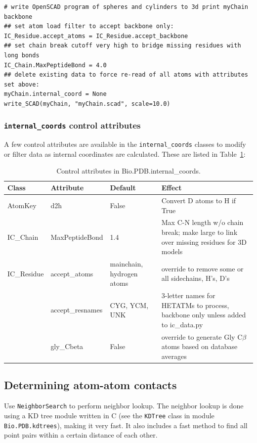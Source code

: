\begin{verbatim}
# write OpenSCAD program of spheres and cylinders to 3d print myChain backbone
## set atom load filter to accept backbone only:
IC_Residue.accept_atoms = IC_Residue.accept_backbone
## set chain break cutoff very high to bridge missing residues with long bonds
IC_Chain.MaxPeptideBond = 4.0
## delete existing data to force re-read of all atoms with attributes set above:
myChain.internal_coord = None
write_SCAD(myChain, "myChain.scad", scale=10.0)
\end{verbatim}

\subsubsection{\texttt{internal\_coords} control attributes}

A few control attributes are available in the \texttt{internal\_coords} classes to modify or
filter data as internal coordinates are calculated.  These are listed in Table~\ref{table:ic-attribs}:

\begin{table}
	\begin{tabular}{|l|l|l|l|}
		\hline
		Class&Attribute&Default&Effect\\
		\hline
		\hline
		AtomKey& d2h&False&Convert D atoms to H if True\\
		\hline
		IC\_Chain&MaxPeptideBond&1.4&Max C-N length w/o chain break; make large to link over missing residues for 3D models \\
		\hline
		IC\_Residue&accept\_atoms&mainchain, hydrogen atoms&override to remove some or all sidechains, H's, D's\\
		\hline
		&accept\_resnames&CYG, YCM, UNK&3-letter names for HETATMs to process, backbone only unless added to ic\_data.py \\
		\hline
		&gly\_Cbeta&False&override to generate Gly C$\beta$ atoms based on database averages \\
		\hline
	\end{tabular}
	\caption{Control attributes in Bio.PDB.internal\_coords.}
	\label{table:ic-attribs}
\end{table}

\subsection{Determining atom-atom contacts}

Use \texttt{NeighborSearch} to perform neighbor lookup.
The neighbor lookup is done using a KD tree module written in C (see the \texttt{KDTree} class in module \texttt{Bio.PDB.kdtrees}), making it very fast.
It also includes a fast method to find all point pairs within a certain distance of each other.

